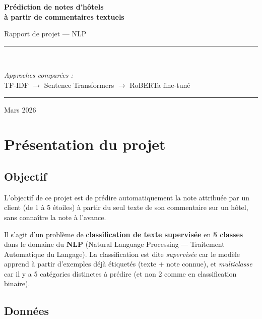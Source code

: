 \documentclass[12pt, a4paper]{article}
\begin{document}
\begin{titlepage}
  \centering
  \vspace*{2cm}
  {\Huge\bfseries Prédiction de notes d'hôtels\\[0.4em]
  à partir de commentaires textuels\par}
  \vspace{1cm}
  {\Large Rapport de projet — NLP\par}
  \vspace{2cm}
  \rule{\linewidth}{0.5pt}\\[0.5em]
  {\large\textit{Approches comparées :}\\[0.3em]
  TF-IDF \quad $\rightarrow$ \quad Sentence Transformers \quad $\rightarrow$ \quad RoBERTa fine-tuné\par}
  \rule{\linewidth}{0.5pt}
  \vfill
  {\large Mars 2026\par}
\end{titlepage}

\tableofcontents
\newpage

\section{Présentation du projet}

\subsection{Objectif}

L'objectif de ce projet est de prédire automatiquement la note attribuée par un client
(de 1 à 5 étoiles) à partir du seul texte de son commentaire sur un hôtel, sans connaître
la note à l'avance.

Il s'agit d'un problème de \textbf{classification de texte supervisée} en \textbf{5 classes}
dans le domaine du \textbf{NLP} (Natural Language Processing — Traitement Automatique du Langage).
La classification est dite \textit{supervisée} car le modèle apprend à partir d'exemples
déjà étiquetés (texte + note connue), et \textit{multiclasse} car il y a 5 catégories
distinctes à prédire (et non 2 comme en classification binaire).

\subsection{Données}
\end{document}
